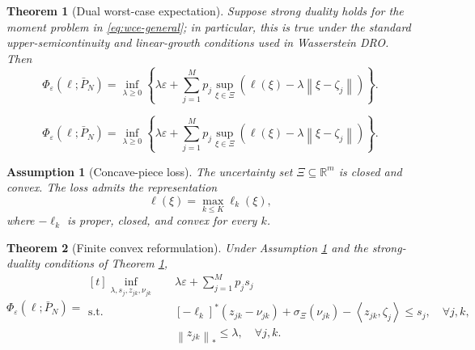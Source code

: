 \documentclass[10pt,a4paper]{amsart}
\newtheorem{theorem}{Theorem}
\newtheorem{assumption}{Assumption}
\newcommand{\Pbar}{\bar P_N}
\newcommand{\R}{\mathbb{R}}
\newcommand{\XiSet}{\Xi}
\newcommand{\inner}[2]{\left\langle #1,#2\right\rangle}
\newcommand{\norm}[1]{\left\lVert #1\right\rVert}
\begin{document}
\begin{theorem}[Dual worst-case expectation]\label{thm:dual-general}
Suppose strong duality holds for the moment problem in \eqref{eq:wce-general}; in particular, this is true under the standard upper-semicontinuity and linear-growth conditions used in Wasserstein DRO. Then
\begin{equation}\label{eq:dual-general}
    \Phi_{\varepsilon}(\ell;\Pbar)
    =\inf_{\lambda\ge0}\left\{\lambda\varepsilon+\sum_{j=1}^Mp_j\sup_{\xi\in\XiSet}\left(\ell(\xi)-\lambda\norm{\xi-\zeta_j}\right)\right\}.
\end{equation}
\end{theorem}

\begin{equation}
    \Phi_{\varepsilon}(\ell;\Pbar)
    =\inf_{\lambda\ge0}\left\{\lambda\varepsilon+\sum_{j=1}^Mp_j\sup_{\xi\in\XiSet}\left(\ell(\xi)-\lambda\norm{\xi-\zeta_j}\right)\right\}.
\end{equation}

\begin{assumption}[Concave-piece loss]\label{ass:concave-piece}
The uncertainty set $\XiSet\subseteq\R^m$ is closed and convex. The loss admits the representation
\begin{equation}\label{eq:max-concave}
    \ell(\xi)=\max_{k\le K}\ell_k(\xi),
\end{equation}
where $-\ell_k$ is proper, closed, and convex for every $k$.
\end{assumption}

\begin{theorem}[Finite convex reformulation]\label{thm:convex-reform-general}
Under Assumption \ref{ass:concave-piece} and the strong-duality conditions of Theorem \ref{thm:dual-general},
\begin{equation}\label{eq:convex-reform-general}
\Phi_{\varepsilon}(\ell;\Pbar)=
\begin{aligned}[t]
\inf_{\lambda,s_j,z_{jk},\nu_{jk}}\quad
&\lambda\varepsilon+\sum_{j=1}^Mp_js_j\\
\mathrm{s.t.}\quad
&[-\ell_k]^*(z_{jk}-\nu_{jk})+\sigma_{\XiSet}(\nu_{jk})-\inner{z_{jk}}{\zeta_j}\le s_j,\quad \forall j,k,\\
&\norm{z_{jk}}_*\le\lambda,\quad \forall j,k.
\end{aligned}
\end{equation}
\end{theorem}
\end{document}
